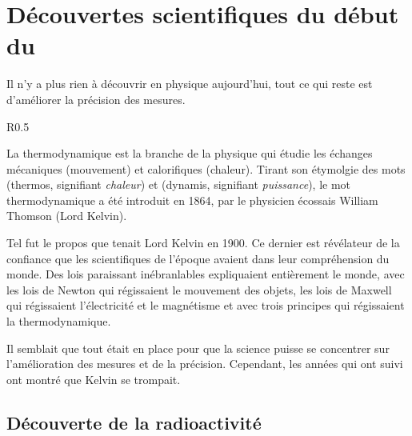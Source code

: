 

\section{Découvertes scientifiques du début du }



\begin{blockquote}
Il n'y a plus rien à découvrir en physique aujourd'hui, tout ce qui reste est d'améliorer la précision des mesures.
\end{blockquote}

\begin{wrapfigure}[15]{R}{0.5\textwidth}
\fontsize{10pt}{12pt}\selectfont
\begin{defi}[title={Thermodynamique}]
La thermodynamique est la branche de la physique qui étudie les échanges mécaniques (mouvement) et calorifiques (chaleur). Tirant son étymolgie des mots  (thermos, signifiant \emph{chaleur}) et  (dynamis, signifiant \emph{puissance}), le mot thermodynamique a été introduit en 1864, par le physicien écossais William Thomson (Lord Kelvin).
\end{defi}
\end{wrapfigure}

Tel fut le propos que tenait Lord Kelvin en 1900. Ce dernier est révélateur de la confiance que les scientifiques de l'époque avaient dans leur compréhension du monde. Des lois paraissant inébranlables expliquaient entièrement le monde, avec les lois de Newton qui régissaient le mouvement des objets, les lois de Maxwell qui régissaient l'électricité et le magnétisme et avec trois principes qui régissaient la thermodynamique. 



Il semblait que tout était en place pour que la science puisse se concentrer sur l'amélioration des mesures et de la précision. Cependant, les années qui ont suivi ont montré que Kelvin se trompait.%

\vspace{-0.5cm}


\subsection{Découverte de la radioactivité}

